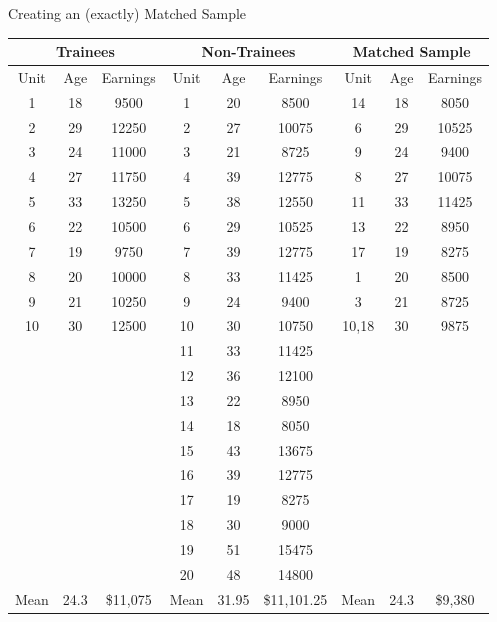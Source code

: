 \documentclass[
  ignorenonframetext,
  aspectratio=169, handout]{beamer}
\begin{document}
\begin{frame}{Creating an (exactly) Matched Sample}
\protect\hypertarget{creating-an-exactly-matched-sample}{}
\scriptsize
\begin{center}
\begin{tabular}{|ccc|ccc|ccc|}
\hline
\multicolumn{3}{|c|}{Trainees} & \multicolumn{3}{c|}{Non-Trainees} & \multicolumn{3}{c|}{Matched Sample} \\ \hline
Unit & Age & Earnings & Unit & Age & Earnings & Unit & Age & Earnings \\ \hline
1 & 18 & 9500 & 1 & 20 & 8500 & 14 & 18 & 8050 \\
2 & 29 & 12250 & 2 & 27 & 10075 & 6 & 29 & 10525 \\
3 & 24 & 11000 & 3 & 21 & 8725 & 9 & 24 & 9400 \\
4 & 27 & 11750 & 4 & 39 & 12775 & 8 & 27 & 10075 \\
5 & 33 & 13250 & 5 & 38 & 12550 & 11 & 33 & 11425 \\
6 & 22 & 10500 & 6 & 29 & 10525 & 13 & 22 & 8950 \\
7 & 19 & 9750 & 7 & 39 & 12775 & 17 & 19 & 8275 \\
8 & 20 & 10000 & 8 & 33 & 11425 & 1 & 20 & 8500 \\
9 & 21 & 10250 & 9 & 24 & 9400 & 3 & 21 & 8725 \\
10 & 30 & 12500 & 10 & 30 & 10750 & 10,18 & 30 & 9875 \\ 
\multicolumn{3}{|c|}{} & 11 & 33 & 11425 & \multicolumn{3}{c|}{} \\ 
\multicolumn{3}{|c|}{} & 12 & 36 & 12100 & \multicolumn{3}{c|}{} \\ 
\multicolumn{3}{|c|}{} & 13 & 22 & 8950 & \multicolumn{3}{c|}{} \\ 
\multicolumn{3}{|c|}{} & 14 & 18 & 8050 & \multicolumn{3}{c|}{} \\ 
\multicolumn{3}{|c|}{} & 15 & 43 & 13675 & \multicolumn{3}{c|}{} \\ 
\multicolumn{3}{|c|}{} & 16 & 39 & 12775 & \multicolumn{3}{c|}{} \\ 
\multicolumn{3}{|c|}{} & 17 & 19 & 8275 & \multicolumn{3}{c|}{} \\ 
\multicolumn{3}{|c|}{} & 18 & 30 & 9000 & \multicolumn{3}{c|}{} \\ 
\multicolumn{3}{|c|}{} & 19 & 51 & 15475 & \multicolumn{3}{c|}{} \\ 
\multicolumn{3}{|c|}{} & 20 & 48 & 14800 & \multicolumn{3}{c|}{} \\ \hline
Mean & \cellcolor{green!25}24.3 & \$11,075 & Mean & 31.95 & \$11,101.25 & Mean & \cellcolor{green!25}24.3 & \$9,380 \\ \hline
\end{tabular}
\end{center}
\normalsize
\end{frame}
\end{document}
